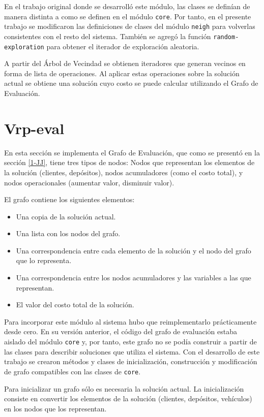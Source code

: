 En el trabajo original donde se desarrolló este módulo, las clases se definían de manera distinta a como se definen en el módulo \texttt{core}. Por tanto, en el presente trabajo se modificaron las definiciones de clases del módulo \texttt{neigh} para volverlas consistentes con el resto del sistema. También se agregó la función \texttt{random-exploration} para obtener el iterador de exploración aleatoria.

A partir del Árbol de Vecindad se obtienen iteradores que generan vecinos en forma de lista de operaciones. Al aplicar estas operaciones sobre la solución actual se obtiene una solución cuyo costo se puede calcular utilizando el Grafo de Evaluación.

\section{Vrp-eval}\label{2-eval}
En esta sección se implementa el Grafo de Evaluación, que como se presentó en la sección \ref{1-JJ}, tiene tres tipos de nodos: Nodos que representan los elementos de la solución (clientes, depósitos), nodos acumuladores (como el costo total), y nodos operacionales (aumentar valor, disminuir valor). 

El grafo contiene los siguientes elementos:

\begin{itemize}
	\item Una copia de la solución actual.
	\item Una lista con los nodos del grafo.
	\item Una correspondencia entre cada elemento de la solución y el nodo del grafo que lo representa.
	\item Una correspondencia entre los nodos acumuladores y las variables a las que representan.
	\item El valor del costo total de la solución.
\end{itemize}

Para incorporar este módulo al sistema hubo que reimplementarlo prácticamente desde cero. En su versión anterior, el código del grafo de evaluación estaba aislado del módulo \texttt{core} y, por tanto, este grafo no se podía construir a partir de las clases para describir soluciones que utiliza el sistema. Con el desarrollo de este trabajo se crearon métodos y clases de inicialización, construcción y modificación de grafo compatibles con las clases de \texttt{core}.

Para inicializar un grafo sólo es necesaria la solución actual. La inicialización consiste en convertir los elementos de la solución (clientes, depósitos, vehículos) en los nodos que los representan.

